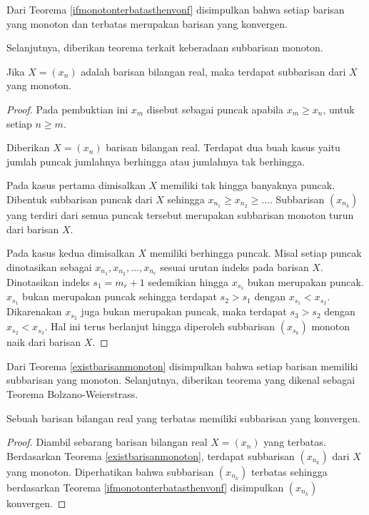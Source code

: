 Dari Teorema \ref{ifmonotonterbatasthenvonf} disimpulkan bahwa setiap barisan yang monoton dan terbatas merupakan barisan yang konvergen.

Selanjutnya, diberikan teorema terkait keberadaan subbarisan monoton.

\begin{teorema}\label{existbarisanmonoton}
    Jika $X = (x_n)$ adalah barisan bilangan real, maka terdapat subbarisan dari $X$ yang monoton.
\end{teorema}

\begin{proof}
    Pada pembuktian ini $x_m$ disebut sebagai puncak apabila $x_m \geq x_n$, untuk setiap $n \geq m$.

    Diberikan $X = (x_n)$ barisan bilangan real. Terdapat dua buah kasus yaitu jumlah puncak jumlahnya berhingga atau jumlahnya tak berhingga.
    
    Pada kasus pertama dimisalkan $X$ memiliki tak hingga banyaknya puncak. Dibentuk subbarisan puncak dari $X$ sehingga $x_{n_1} \geq x_{n_2} \geq \dots$. Subbarisan $(x_{n_k})$ yang terdiri dari semua puncak tersebut merupakan subbarisan monoton turun dari barisan $X$.

    Pada kasus kedua dimisalkan $X$ memiliki berhingga puncak. Misal setiap puncak dinotasikan sebagai $x_{n_1},x_{n_2}, \dots, x_{n_r}$ sesuai urutan indeks pada barisan $X$. Dinotasikan indeks $s_1 = m_r + 1$ sedemikian hingga $x_{s_1}$ bukan merupakan puncak. $x_{s_1}$ bukan merupakan puncak sehingga terdapat $s_2 > s_1$ dengan $x_{s_1} < x_{s_2}$. Dikarenakan $x_{s_2}$ juga bukan merupakan puncak, maka terdapat $s_3 > s_2$ dengan $x_{s_2} < x_{s_3}$. Hal ini terus berlanjut hingga diperoleh subbarisan $(x_{s_k})$ monoton naik dari barisan $X$.
\end{proof}

Dari Teorema \ref{existbarisanmonoton} disimpulkan bahwa setiap barisan memiliki subbarisan yang monoton. Selanjutnya, diberikan teorema yang dikenal sebagai Teorema Bolzano-Weierstrass.

\begin{teorema}\label{bolzano-w}
Sebuah barisan bilangan real yang terbatas memiliki subbarisan yang konvergen.
\end{teorema}

\begin{proof}
    Diambil sebarang barisan bilangan real $X = (x_n)$ yang terbatas. Berdasarkan Teorema \ref{existbarisanmonoton}, terdapat subbarisan $(x_{n_k})$ dari $X$ yang monoton. Diperhatikan bahwa subbarisan $(x_{n_k})$ terbatas sehingga berdasarkan Teorema \ref{ifmonotonterbatasthenvonf} disimpulkan $(x_{n_k})$ konvergen.
\end{proof}

